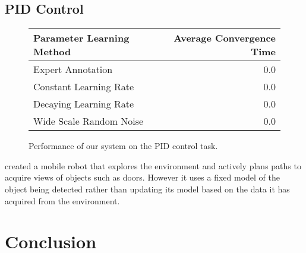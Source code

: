 \documentclass[conference]{IEEEtran}
\begin{document}
\subsection{PID Control}

\begin{figure}
  \begin{center}
  \begin{tabular}{|l|r|}
  \hline
  Parameter Learning Method & Average Convergence Time \\ \hline
  Expert Annotation & 0.0 \\ \hline
  Constant Learning Rate & 0.0 \\ \hline
  Decaying Learning Rate & 0.0 \\ \hline
  Wide Scale Random Noise & 0.0 \\ \hline
  \end{tabular}
  \caption{Performance of our system on the PID control task.}
  \end{center}
\end{figure}






\citet{velez11} created a mobile robot that explores the environment
and actively plans paths to acquire views of objects such as doors.
However it uses a fixed model of the object being detected rather than
updating its model based on the data it has acquired from the
environment.
\citet{atanasov13} 




\section{Conclusion}
\end{document}
